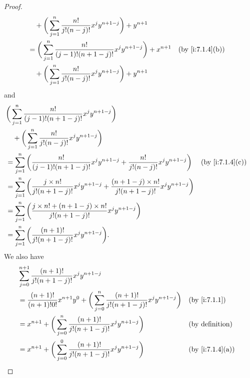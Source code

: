 \begin{proof}
\begin{align*}
                    & \quad + \bigg(\sum_{j = 1}^n \dfrac{n!}{j!(n - j)!} x^j y^{n + 1 - j}\bigg) + y^{n + 1}                                 \\
                    & = \bigg(\sum_{j = 1}^n \dfrac{n!}{(j - 1)!(n + 1 - j)!} x^j y^{n + 1 - j}\bigg) + x^{n + 1} &  & \by{i:7.1.4}[b]        \\
                    & \quad + \bigg(\sum_{j = 1}^n \dfrac{n!}{j!(n - j)!} x^j y^{n + 1 - j}\bigg) + y^{n + 1}
  \end{align*}
  and
  \begin{align*}
     & \bigg(\sum_{j = 1}^n \dfrac{n!}{(j - 1)!(n + 1 - j)!} x^j y^{n + 1 - j}\bigg)                                                                                             \\
     & \quad + \bigg(\sum_{j = 1}^n \dfrac{n!}{j!(n - j)!} x^j y^{n + 1 - j}\bigg)                                                                                               \\
     & = \sum_{j = 1}^n \bigg(\dfrac{n!}{(j - 1)!(n + 1 - j)!} x^j y^{n + 1 - j} + \dfrac{n!}{j!(n - j)!} x^j y^{n + 1 - j}\bigg)                           &  & \by{i:7.1.4}[c] \\
     & = \sum_{j = 1}^n \bigg(\dfrac{j \times n!}{j!(n + 1 - j)!} x^j y^{n + 1 - j} + \dfrac{(n + 1 - j) \times n!}{j!(n + 1 - j)!} x^j y^{n + 1 - j}\bigg)                      \\
     & = \sum_{j = 1}^n \bigg(\dfrac{j \times n! + (n + 1 - j) \times n!}{j!(n + 1 - j)!} x^j y^{n + 1 - j}\bigg)                                                                \\
     & = \sum_{j = 1}^n \bigg(\dfrac{(n + 1)!}{j!(n + 1 - j)!} x^j y^{n + 1 - j}\bigg).
  \end{align*}
  We also have
  \begin{align*}
     & \sum_{j = 0}^{n + 1} \dfrac{(n + 1)!}{j!(n + 1 - j)!} x^j y^{n + 1 - j}                                                                                   \\
     & = \dfrac{(n + 1)!}{(n + 1)! 0!} x^{n + 1} y^0 + \bigg(\sum_{j = 0}^n \dfrac{(n + 1)!}{j!(n + 1 - j)!} x^j y^{n + 1 - j}\bigg) &  & \by{i:7.1.1}           \\
     & = x^{n + 1} + \bigg(\sum_{j = 0}^n \dfrac{(n + 1)!}{j!(n + 1 - j)!} x^j y^{n + 1 - j}\bigg)                                   &  & \text{(by definition)} \\
     & = x^{n + 1} + \bigg(\sum_{j = 0}^0 \dfrac{(n + 1)!}{j!(n + 1 - j)!} x^j y^{n + 1 - j}\bigg)                                   &  & \by{i:7.1.4}[a]        \\

\end{align*}
\end{proof}
